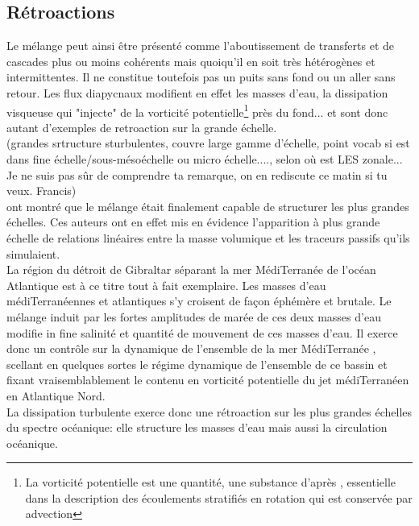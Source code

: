 \subsection{Rétroactions}
\label{subsection_retroactions}
Le mélange peut ainsi être présenté comme l'aboutissement de transferts et de cascades plus ou moins cohérents mais quoiqu'il en soit très hétérogènes et intermittentes. Il ne constitue toutefois pas un puits sans fond ou un aller sans retour. Les flux diapycnaux modifient en effet les masses d'eau, la dissipation visqueuse qui "injecte" de la vorticité potentielle\footnote{La vorticité potentielle est une quantité, une substance d'après \cite{haynes_conservation_1990}, essentielle dans la description des écoulements stratifiés en rotation qui est conservée par advection} près du fond... et sont donc autant d'exemples de retroaction sur la grande échelle.\\
\color{red}(grandes srtructure sturbulentes, couvre large gamme d'échelle, point vocab si est dans fine échelle/sous-mésoéchelle ou micro échelle...., selon où est LES zonale... Je ne suis pas sûr de comprendre ta remarque, on en rediscute ce matin si tu veux. Francis)\color{blue}\\
\cite{penney_2020} ont montré que le mélange était finalement capable de structurer les plus grandes échelles. Ces auteurs ont en effet mis en évidence l'apparition à plus grande échelle de relations linéaires entre la masse volumique et les traceurs passifs qu'ils simulaient.\\
La région du détroit de Gibraltar séparant la mer MédiTerranée de l'océan Atlantique est à ce titre tout à fait exemplaire. Les masses d'eau médiTerranéennes et atlantiques s'y croisent de façon éphémère et brutale. Le mélange induit par les fortes amplitudes de marée de ces deux masses d'eau  modifie in fine salinité et quantité de mouvement de ces masses d'eau. Il exerce donc un contrôle sur la dynamique de l'ensemble de la mer MédiTerranée \citep{FA1988}, scellant en quelques sortes le régime dynamique de l'ensemble de ce bassin et fixant vraisemblablement le contenu en vorticité potentielle du jet médiTerranéen en Atlantique Nord.\\
La dissipation turbulente exerce donc une rétroaction sur les plus grandes échelles du spectre océanique: elle  structure les masses d'eau mais aussi la circulation océanique.
\color{black}

